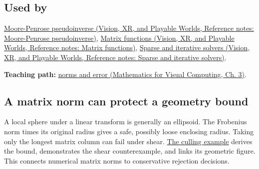 \subsection{Used by}\label{appendix-f8657bac66e5-used-by}

\hypertarget{appendix-f8657bac66e5-used-by}{}

\href{../07-Vision-XR-and-Playable-Worlds/main.pdf\#nameddest=appendix-541306fdbc1b}{Moore-Penrose pseudoinverse (Vision, XR, and Playable Worlds, Reference notes: Moore-Penrose pseudoinverse)}, \href{../07-Vision-XR-and-Playable-Worlds/main.pdf\#nameddest=appendix-0f4bc2bf2b1f}{Matrix functions (Vision, XR, and Playable Worlds, Reference notes: Matrix functions)}, \href{../07-Vision-XR-and-Playable-Worlds/main.pdf\#nameddest=appendix-67c87a3d9e94}{Sparse and iterative solvers (Vision, XR, and Playable Worlds, Reference notes: Sparse and iterative solvers)}.

\textbf{Teaching path:} \href{../02-Mathematics-for-Visual-Computing/main.pdf\#nameddest=01-foundations-i-ch019-matrix-norms-give-scale-to-residuals-and-error-claims}{norms and error (Mathematics for Visual Computing, Ch. 3)}.

\subsection{A matrix norm can protect a geometry bound}\label{appendix-f8657bac66e5-a-matrix-norm-can-protect-a-geometry-bound}

\hypertarget{appendix-f8657bac66e5-a-matrix-norm-can-protect-a-geometry-bound}{}

A local sphere under a linear transform is generally an ellipsoid. The Frobenius norm times its original radius gives a safe, possibly loose enclosing radius. Taking only the longest matrix column can fail under shear. \hyperref[04-visual-computing-ii-ch028-a-line-corridor-can-be-a-cheap-prefilter-for-shadow-caster-work]{The culling example} derives the bound, demonstrates the shear counterexample, and links its geometric figure. This connects numerical matrix norms to conservative rejection decisions.
